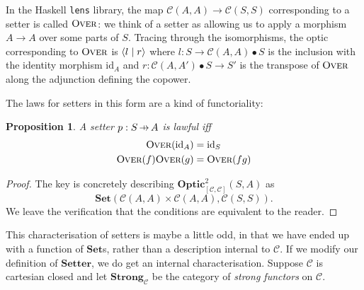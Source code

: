 \documentclass[11pt,letterpaper]{article}
\theoremstyle{plain}
\newtheorem{proposition}[theorem]{Proposition}
\theoremstyle{definition}
\newcommand{\C}{\mathscr{C}}
\newcommand{\lenslib}{\texttt{lens}}
\newcommand{\Set}{\mathbf{Set}}
\newcommand{\Strong}{\mathbf{Strong}}
\newcommand{\Twoptic}{\mathbf{Optic}^2}
\newcommand{\Setter}{\mathbf{Setter}}
\newcommand{\id}{\mathrm{id}}
\newcommand{\rep}[2]{{\ensuremath \left\langle #1 \mid #2 \right\rangle}}
\newcommand{\fover}{\textsc{Over}}
\newcommand{\hto}{\ensuremath{\,\mathaccent\shortmid\rightarrow\,}}
\newcommand{\todo}[1]{\textcolor{red}{\small #1}}
\begin{document}
In the Haskell \lenslib{} library, the map $\C(A, A) \to \C(S,S)$ corresponding to a setter is called $\fover$: we think of a setter as allowing us to apply a morphism $A \to A$ over some parts of $S$. Tracing through the isomorphisms, the optic corresponding to $\fover$ is $\rep{l}{r}$ where $l : S \to \C(A, A) \bullet S$ is the inclusion with the identity morphism $\id_A$ and $r : \C(A, A') \bullet S \to S'$ is the transpose of $\fover$ along the adjunction defining the copower.

The laws for setters in this form are a kind of functoriality:

\begin{proposition}
A setter $p : S \hto A$ is lawful iff
\begin{align*}
\fover(\id_A) &= \id_S \\
\fover(f)\fover(g)&= \fover(fg)
\end{align*}
\end{proposition}
\begin{proof}
The key is concretely describing $\Twoptic_{[\C, \C]}(S, A)$ as \[ \Set( \C(A, A) \times \C(A, A), \C(S, S) ).\] We leave the verification that the conditions are equivalent to the reader. %
\end{proof}

This characterisation of setters is maybe a little odd, in that we have ended up with a function of $\Set$s, rather than a description internal to $\C$. If we modify our definition of $\Setter$, we do get an internal characterisation. Suppose $\C$ is cartesian closed and let $\Strong_\C$ be the category of \emph{strong functors} on $\C$.
\end{document}

